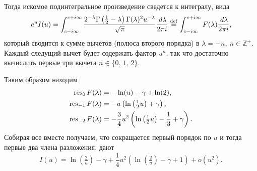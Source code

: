 Тогда искомое подинтегральное произведение сведется к интегралу, вида
\begin{equation*}
	e^u I(u) = \int_{c - i \infty}^{c + i \infty} \frac{2^{-\lambda }  \Gamma \left(\frac{1}{2}-\lambda \right) \Gamma (\lambda )^2 u^{-\lambda }}{\sqrt{\pi }} \frac{\, d \lambda}{2 \pi i} \overset{\mathrm{def}}{=} \int_{c - i \infty}^{c + i \infty} F(\lambda) \frac{\, d \lambda}{2 \pi i} ,
\end{equation*}
который сводится к сумме вычетов (полюса второго порядка) в $\lambda = -n,\ n \in \mathbb{Z}^+$. Каждый следущий вычет будет содержать фактор $u^n$, так что достаточно вычислить первые три вычета $n \in \{0,\,  1,\,  2\}$. 

Таким образом находим 
\begin{align*}
	\mathop{\mathrm{res}}\nolimits_0 F(\lambda) &= -\ln (u)-\gamma +\ln (2), \\
	\mathop{\mathrm{res}}\nolimits_{-1} F(\lambda) &= -u \left(\ln \left(\tfrac{1}{2}u\right)+\gamma \right), \\
	\mathop{\mathrm{res}}\nolimits_{-2} F(\lambda) &= -\frac{3}{4} u^2 \left(\ln \left(\tfrac{1}{2}u\right)-\frac{1}{3}+\gamma \right).
\end{align*}
Собирая все вместе получаем, что сокращается первый порядок по  $u$ и тогда первые два члена разложения, дают
\begin{equation*}
	I(u) = \ln\left(\tfrac{2}{u}\right)- \gamma + \frac{1}{4} u^2 (\ln\left(\tfrac{2}{u}\right)-\gamma +1 ) + o(u^2).
\end{equation*}
